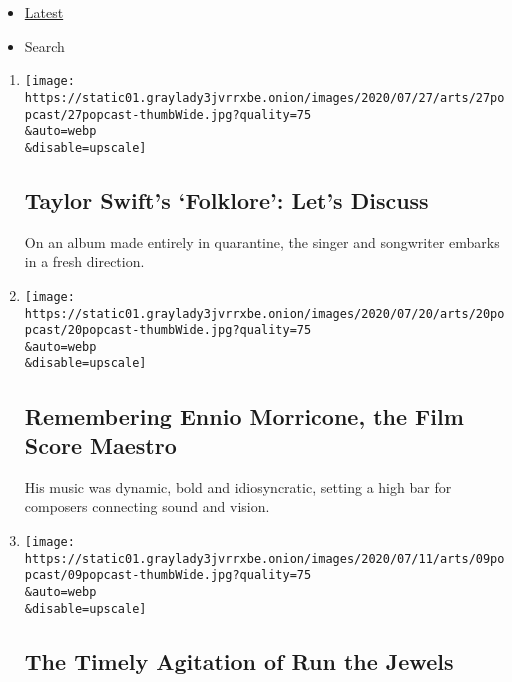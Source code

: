 \begin{itemize}
\tightlist
\item
  \protect\hyperlink{stream-panel}{Latest}
\item
  Search
\end{itemize}

\begin{enumerate}
\def\labelenumi{\arabic{enumi}.}
\item
  \href{/2020/07/27/arts/music/popcast-taylor-swift-folklore.html}{}

  \texttt{[image: https://static01.graylady3jvrrxbe.onion/images/2020/07/27/arts/27popcast/27popcast-thumbWide.jpg?quality=75\\\&auto=webp\\\&disable=upscale]}

  \hypertarget{taylor-swifts-folklore-lets-discuss}{%
  \subsection{Taylor Swift's `Folklore': Let's
  Discuss}\label{taylor-swifts-folklore-lets-discuss}}

  On an album made entirely in quarantine, the singer and songwriter
  embarks in a fresh direction.
\item
  \href{/2020/07/20/arts/music/popcast-ennio-morricone.html}{}

  \texttt{[image: https://static01.graylady3jvrrxbe.onion/images/2020/07/20/arts/20popcast/20popcast-thumbWide.jpg?quality=75\\\&auto=webp\\\&disable=upscale]}

  \hypertarget{remembering-ennio-morricone-the-film-score-maestro}{%
  \subsection{Remembering Ennio Morricone, the Film Score
  Maestro}\label{remembering-ennio-morricone-the-film-score-maestro}}

  His music was dynamic, bold and idiosyncratic, setting a high bar for
  composers connecting sound and vision.
\item
  \href{/2020/07/09/arts/music/popcast-run-the-jewels.html}{}

  \texttt{[image: https://static01.graylady3jvrrxbe.onion/images/2020/07/11/arts/09popcast/09popcast-thumbWide.jpg?quality=75\\\&auto=webp\\\&disable=upscale]}

  \hypertarget{the-timely-agitation-of-run-the-jewels}{%
  \subsection{The Timely Agitation of Run the
  Jewels}\label{the-timely-agitation-of-run-the-jewels}}


\end{enumerate}
